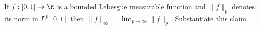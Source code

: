 If $f:[0,1]\rightarrow \R$ is a bounded Lebesgue measurable function
and $\|f\|_p$ denotes its norm in $L^p[0,1]$ then
$\|f\|_{\infty}=\lim_{p\rightarrow \infty}\|f\|_p$. Substantiate this
claim.
